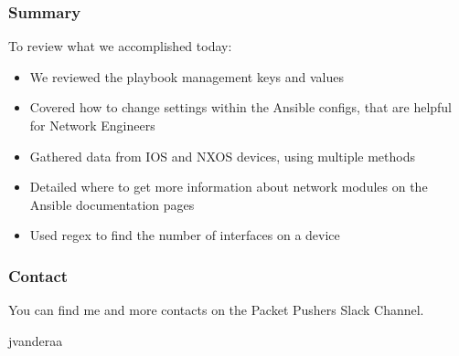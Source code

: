 \documentclass{beamer}
\begin{document}
\begin{frame}
  \frametitle{Summary}
    To review what we accomplished today:
    \begin{itemize}
      \item <1-> We reviewed the playbook management keys and values
      \item <2-> Covered how to change settings within the Ansible configs, that are helpful for Network Engineers
      \item <3-> Gathered data from IOS and NXOS devices, using multiple methods
      \item <4-> Detailed where to get more information about network modules on the Ansible documentation pages
      \item <5-> Used regex to find the number of interfaces on a device
    \end{itemize}
\end{frame}

\begin{frame}
  \frametitle{Contact}
  \huge
  You can find me and more contacts on the Packet Pushers Slack Channel. 
  \linebreak
  \begin{center}
    \normalsize
    \faSlack \hspace{.1cm}jvanderaa  
  \end{center}
  
\end{frame}
\end{document}
